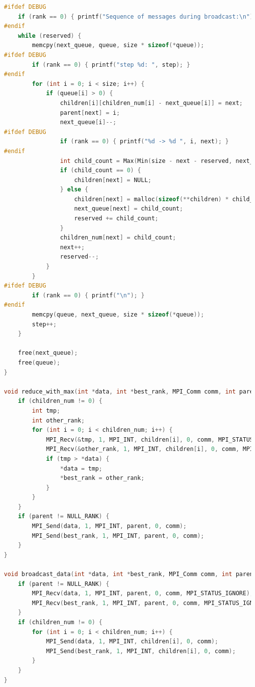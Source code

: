 \documentclass[a4paper]{article}
\begin{document}
\begin{lstlisting}[caption=transputer\_matrix.c, label={lst:1}, language=C]
#ifdef DEBUG
    if (rank == 0) { printf("Sequence of messages during broadcast:\n"); }
#endif
    while (reserved) {
        memcpy(next_queue, queue, size * sizeof(*queue));
#ifdef DEBUG
        if (rank == 0) { printf("step %d: ", step); }
#endif
        for (int i = 0; i < size; i++) {
            if (queue[i] > 0) {
                children[i][children_num[i] - next_queue[i]] = next;
                parent[next] = i;
                next_queue[i]--;
#ifdef DEBUG
                if (rank == 0) { printf("%d -> %d ", i, next); }
#endif
                int child_count = Max(Min(size - next - reserved, next_queue[i]), 0);
                if (child_count == 0) {
                    children[next] = NULL;
                } else {
                    children[next] = malloc(sizeof(**children) * child_count);
                    next_queue[next] = child_count;
                    reserved += child_count;
                }
                children_num[next] = child_count;
                next++;
                reserved--;
            }
        }
#ifdef DEBUG
        if (rank == 0) { printf("\n"); }
#endif
        memcpy(queue, next_queue, size * sizeof(*queue));
        step++;
    }

    free(next_queue);
    free(queue);
}

void reduce_with_max(int *data, int *best_rank, MPI_Comm comm, int parent, int children_num, int *children) {
    if (children_num != 0) {
        int tmp;
        int other_rank;
        for (int i = 0; i < children_num; i++) {
            MPI_Recv(&tmp, 1, MPI_INT, children[i], 0, comm, MPI_STATUS_IGNORE);
            MPI_Recv(&other_rank, 1, MPI_INT, children[i], 0, comm, MPI_STATUS_IGNORE);
            if (tmp > *data) {
                *data = tmp;
                *best_rank = other_rank;
            }
        }
    }
    if (parent != NULL_RANK) {
        MPI_Send(data, 1, MPI_INT, parent, 0, comm);
        MPI_Send(best_rank, 1, MPI_INT, parent, 0, comm);
    }
}

void broadcast_data(int *data, int *best_rank, MPI_Comm comm, int parent, int children_num, int *children) {
    if (parent != NULL_RANK) {
        MPI_Recv(data, 1, MPI_INT, parent, 0, comm, MPI_STATUS_IGNORE);
        MPI_Recv(best_rank, 1, MPI_INT, parent, 0, comm, MPI_STATUS_IGNORE);
    }
    if (children_num != 0) {
        for (int i = 0; i < children_num; i++) {
            MPI_Send(data, 1, MPI_INT, children[i], 0, comm);
            MPI_Send(best_rank, 1, MPI_INT, children[i], 0, comm);
        }
    }
}


\end{lstlisting}
\end{document}
